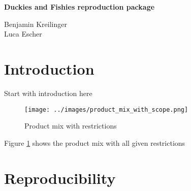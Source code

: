 \documentclass[12pt]{article}
\newenvironment{heading}{\Large \centering}\par
\newenvironment{textbody}{\normalsize}\par
\begin{document}
\begin{heading}
\textbf{Duckies and Fishies reproduction package}
\end{heading}

\vspace{0.5cm}

\begin{heading}
    Benjamin Kreilinger
    \\
    Luca Escher
\end{heading}

\section{Introduction}

\begin{textbody}
    Start with introduction here
\end{textbody}

\begin{figure}[h]
    \centering
    \texttt{[image: ../images/product\_mix\_with\_scope.png]}
    \caption{Product mix with restrictions}
    \label{fig:product_mix_with_restrictions}
\end{figure}

\begin{textbody}
    Figure \ref{fig:product_mix_with_restrictions} shows the product mix with all given restrictions
\end{textbody}
 
 \section{Reproducibility}
 
\end{document}
